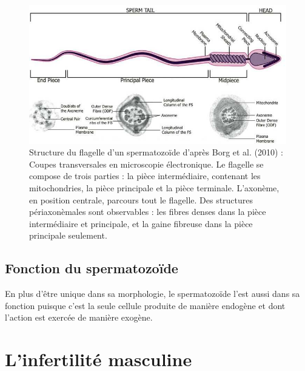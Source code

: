 \documentclass[12pt,twoside]{reedthesis}
\theoremstyle{definition}
\theoremstyle{definition}
\theoremstyle{remark}
\begin{document}
  \begin{figure}
  
  {\centering \includegraphics[scale=.55]{figure/sperm2} 
  
  }
  
  \caption[Structure du flagelle d’un spermatozoïde d’après Borg et al. (2010)]{Structure du flagelle d’un spermatozoïde d’après Borg et al. (2010) : Coupes transversales en microscopie électronique. Le flagelle se compose de trois parties : la pièce intermédiaire, contenant les mitochondries, la pièce principale et la pièce terminale. L’axonème, en position centrale, parcours tout le flagelle. Des structures périaxonèmales sont observables : les fibres denses dans la pièce intermédiaire et principale, et la gaine fibreuse dans la pièce principale seulement.}\label{fig:flagelle}
  \end{figure}
  
  \subsection{Fonction du spermatozoïde}\label{fonction-du-spermatozoide}
  
  En plus d'être unique dans sa morphologie, le spermatozoïde l'est aussi
  dans sa fonction puisque c'est la seule cellule produite de manière
  endogène et dont l'action est exercée de manière exogène.
  
  \section{L'infertilité masculine}\label{linfertilite-masculine}
  
\end{document}
